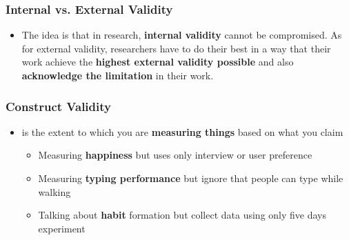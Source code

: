 \documentclass{beamer}
\begin{document}

\begin{frame}
\frametitle{Internal vs. External Validity}
\begin{itemize}
\item The idea is that in research, \textbf{internal validity} cannot be compromised.  As for external validity, researchers have to do their best in a way that their work achieve the \textbf{highest external validity possible} and also \textbf{acknowledge the limitation} in their work.
\end{itemize}
\end{frame}

\begin{frame}
\frametitle{Construct Validity}
\begin{itemize}
\item is the extent to which you are \textbf{measuring things} based on what you claim
\begin{itemize}
\item Measuring \textbf{happiness} but uses only interview or user preference%
\item Measuring \textbf{typing performance }but ignore that people can type while walking %
\item Talking about \textbf{habit} formation but collect data using only five days experiment
\end{itemize}
\end{itemize}
\end{frame}
\end{document}
